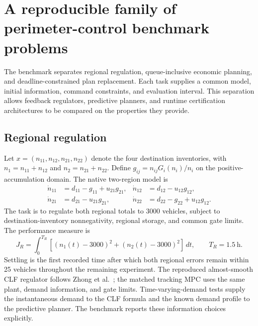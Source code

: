 \section{A reproducible family of perimeter-control benchmark problems}
\label{sec:reusable-benchmark}

The benchmark separates regional regulation, queue-inclusive economic planning,
and deadline-constrained plan replacement. Each task supplies a common model,
initial information, command constraints, and evaluation interval. This
separation allows feedback regulators, predictive planners, and runtime
certification architectures to be compared on the properties they provide.

\subsection{Regional regulation}
Let $x=(n_{11},n_{12},n_{21},n_{22})$ denote the four destination inventories,
with $n_1=n_{11}+n_{12}$ and $n_2=n_{21}+n_{22}$. Define
$g_{ij}=n_{ij}G_i(n_i)/n_i$ on the positive-accumulation domain. The native
two-region model is
\begin{align}
 \dot n_{11}&=d_{11}-g_{11}+u_{21}g_{21},&
 \dot n_{12}&=d_{12}-u_{12}g_{12},\\
 \dot n_{21}&=d_{21}-u_{21}g_{21},&
 \dot n_{22}&=d_{22}-g_{22}+u_{12}g_{12}.
\end{align}
The task is to regulate both regional totals to 3000 vehicles, subject to
destination-inventory nonnegativity, regional storage, and common gate limits.
The performance measure is
\begin{equation}
 J_R=\int_0^{T_R}\left[(n_1(t)-3000)^2+(n_2(t)-3000)^2\right]\,dt,
 \qquad T_R=1.5\ \mathrm{h}.
\end{equation}
Settling is the first recorded time after which both regional errors remain
within 25 vehicles throughout the remaining experiment. The reproduced
almost-smooth CLF regulator follows Zhong et al.\ \cite{zhong2018robust}; the matched tracking MPC
uses the same plant, demand information, and gate limits. Time-varying-demand
tests supply the instantaneous demand to the CLF formula and the known demand
profile to the predictive planner. The benchmark reports these information
choices explicitly.

